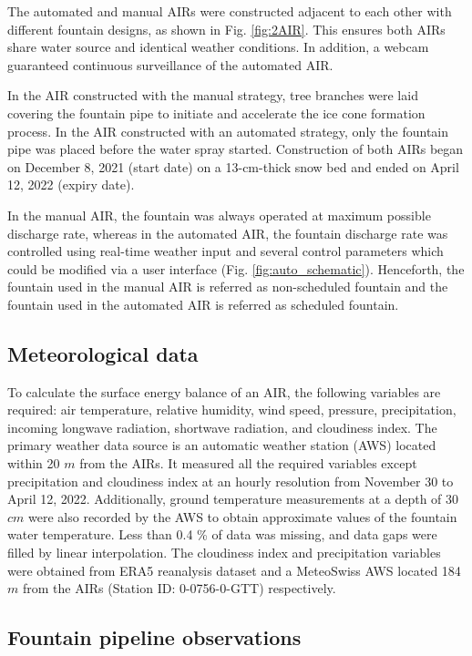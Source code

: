 \documentclass[tc, manuscript]{copernicus}
\begin{document}
The automated and manual AIRs were constructed adjacent to each other with different fountain
designs, as shown in Fig. \ref{fig:2AIR}. This ensures both AIRs share water source and identical
weather conditions. In addition, a webcam guaranteed continuous surveillance of the automated AIR.   

In the AIR constructed with the manual strategy, tree branches were laid covering the fountain pipe to
initiate and accelerate the ice cone formation process. In the AIR constructed with an automated strategy, only
the fountain pipe was placed before the water spray started. Construction of both AIRs began on December 8, 2021
(start date) on a 13-cm-thick snow bed and ended on April 12, 2022 (expiry date).

In the manual AIR, the fountain was always operated at maximum possible discharge rate, whereas in the automated
AIR, the fountain discharge rate was controlled using real-time weather input and several control parameters
which could be modified via a user interface (Fig. \ref{fig:auto_schematic}). Henceforth, the fountain used in
the manual AIR is referred as non-scheduled fountain and the fountain used in the automated AIR is referred as
scheduled fountain.

\subsection{Meteorological data}

To calculate the surface energy balance of an AIR, the following variables are required: air temperature,
relative humidity, wind speed, pressure, precipitation, incoming longwave radiation, shortwave radiation, and
cloudiness index. The primary weather data source is an automatic weather station (AWS) located within 20 $m$
from the AIRs. It measured all the required variables except precipitation and cloudiness index at an hourly
resolution from November 30 to April 12, 2022. Additionally, ground temperature measurements at a depth of 30 $cm$
were also recorded by the AWS to obtain approximate values of the fountain water temperature. Less than 0.4 \%
of data was missing, and data gaps were filled by linear interpolation. The cloudiness index and precipitation
variables were obtained from ERA5 reanalysis dataset \citep{hersbachERA5GlobalReanalysis2020} and a MeteoSwiss
AWS located 184 $m$ from the AIRs (Station ID: 0-0756-0-GTT) respectively.


\subsection{Fountain pipeline observations}
\end{document}
